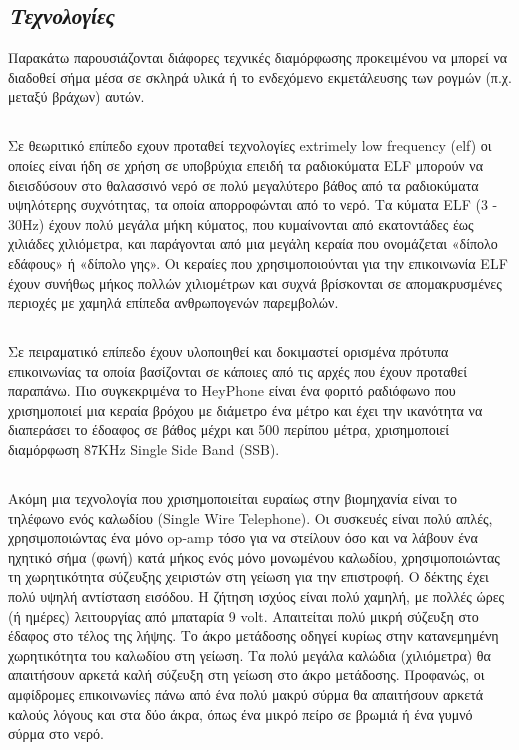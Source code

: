 \documentclass[12pt]{article}
\begin{document}
\begin{multicols}{2}
    \section{\textit{\normalsize Τεχνολογίες}}
    Παρακάτω παρουσιάζονται διάφορες τεχνικές διαμόρφωσης προκειμένου να μπορεί να διαδοθεί σήμα μέσα σε σκληρά υλικά ή το ενδεχόμενο εκμετάλευσης των ρογμών (π.χ. μεταξύ βράχων) αυτών.

    \subsection{} Σε θεωριτικό επίπεδο εχουν προταθεί τεχνολογίες extrimely low frequency (elf) οι οποίες είναι ήδη σε χρήση σε υποβρύχια επειδή τα ραδιοκύματα ELF μπορούν να διεισδύσουν στο θαλασσινό νερό σε πολύ μεγαλύτερο βάθος από τα ραδιοκύματα υψηλότερης συχνότητας, τα οποία απορροφώνται από το νερό. Τα κύματα ELF (3 - 30Hz) έχουν πολύ μεγάλα μήκη κύματος, που κυμαίνονται από εκατοντάδες έως χιλιάδες χιλιόμετρα, και παράγονται από μια μεγάλη κεραία που ονομάζεται «δίπολο εδάφους» ή «δίπολο γης». Οι κεραίες που χρησιμοποιούνται για την επικοινωνία ELF έχουν συνήθως μήκος πολλών χιλιομέτρων και συχνά βρίσκονται σε απομακρυσμένες περιοχές με χαμηλά επίπεδα ανθρωπογενών παρεμβολών.

    \subsection{}
    Σε πειραματικό επίπεδο έχουν υλοποιηθεί και δοκιμαστεί ορισμένα πρότυπα επικοινωνίας τα οποία βασίζονται σε κάποιες από τις αρχές που έχουν προταθεί παραπάνω. Πιο συγκεκριμένα το HeyPhone είναι ένα φοριτό ραδιόφωνο που χρισημοποιεί μια κεραία βρόχου με διάμετρο ένα μέτρο και έχει την ικανότητα να διαπεράσει το έδοαφος σε βάθος μέχρι και 500 περίπου μέτρα, χρισημοποιεί διαμόρφωση 87KHz Single Side Band (SSB).
    \subsection{}
    Ακόμη μια τεχνολογία που χρισημοποιείται ευραίως στην βιομηχανία είναι το τηλέφωνο ενός καλωδίου (Single Wire Telephone). Οι συσκευές είναι πολύ απλές, χρησιμοποιώντας ένα μόνο op-amp τόσο για να στείλουν όσο και να λάβουν ένα ηχητικό σήμα (φωνή) κατά μήκος ενός μόνο μονωμένου καλωδίου, χρησιμοποιώντας τη χωρητικότητα σύζευξης χειριστών στη γείωση για την επιστροφή. Ο δέκτης έχει πολύ υψηλή αντίσταση εισόδου. Η ζήτηση ισχύος είναι πολύ χαμηλή, με πολλές ώρες (ή ημέρες) λειτουργίας από μπαταρία 9 volt. Απαιτείται πολύ μικρή σύζευξη στο έδαφος στο τέλος της λήψης. Το άκρο μετάδοσης οδηγεί κυρίως στην κατανεμημένη χωρητικότητα του καλωδίου στη γείωση. Τα πολύ μεγάλα καλώδια (χιλιόμετρα) θα απαιτήσουν αρκετά καλή σύζευξη στη γείωση στο άκρο μετάδοσης. Προφανώς, οι αμφίδρομες επικοινωνίες πάνω από ένα πολύ μακρύ σύρμα θα απαιτήσουν αρκετά καλούς λόγους και στα δύο άκρα, όπως ένα μικρό πείρο σε βρωμιά ή ένα γυμνό σύρμα στο νερό.


\end{multicols}
\end{document}
